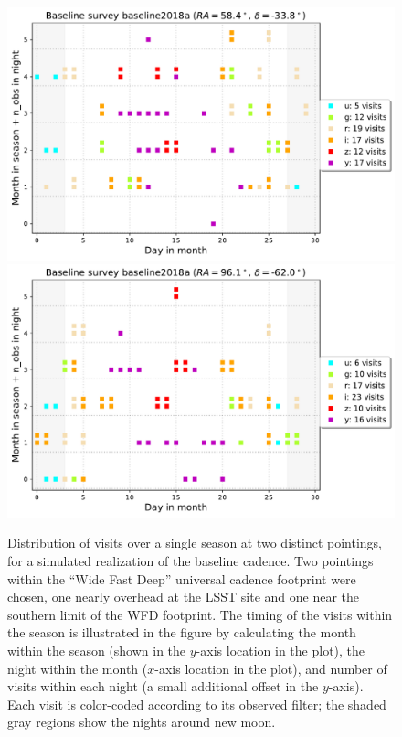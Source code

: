 \begin{figure}
\includegraphics[width=1.0\hsize,clip]{cadence_zenith}
\includegraphics[width=1.0\hsize,clip]{cadence_circumpolar}
\caption{Distribution of visits over a single season at two distinct pointings,
for a simulated realization of the baseline cadence. Two pointings within the ``Wide Fast Deep''
universal cadence footprint were chosen, one nearly overhead at the LSST site and one
near the southern limit of the WFD footprint. The timing of the visits within the season
is illustrated in the figure by calculating the month within the season (shown in the $y$-axis
location in the plot), the night within the month ($x$-axis location in the plot), and number of visits
within each night (a small additional offset in the $y$-axis). Each visit is color-coded according to
its observed filter; the shaded gray regions show the nights around new moon.}
\label{Fig:fieldCadence}
\end{figure}

